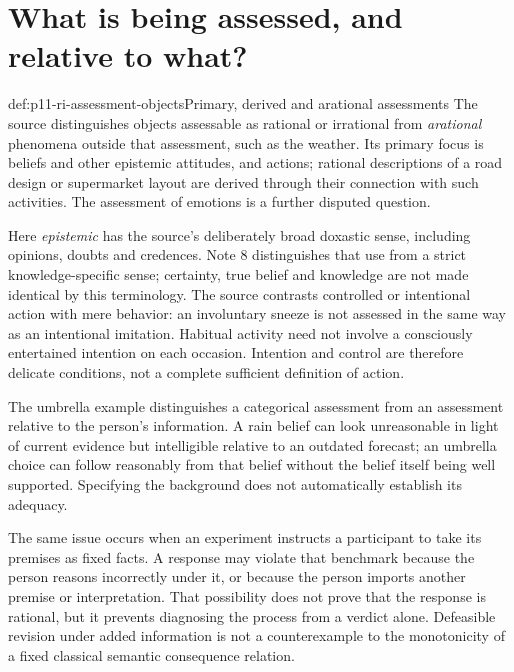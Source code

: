 \section{What is being assessed, and relative to what?}

\begin{hbdefinition}{def:p11-ri-assessment-objects}{Primary, derived and arational assessments}
The source distinguishes objects assessable as rational or irrational
from \emph{arational} phenomena outside that assessment, such as
the weather. Its primary focus is beliefs and other epistemic attitudes,
and actions; rational descriptions of a road design or supermarket
layout are derived through their connection with such activities.
The assessment of emotions is a further disputed question.

Here \emph{epistemic} has the source's deliberately broad doxastic
sense, including opinions, doubts and credences. Note 8 distinguishes
that use from a strict knowledge-specific sense; certainty, true
belief and knowledge are not made identical by this terminology.
The source contrasts controlled or intentional action with mere
behavior: an involuntary sneeze is not assessed in the same way as
an intentional imitation. Habitual activity need not involve a
consciously entertained intention on each occasion. Intention and
control are therefore delicate conditions, not a complete sufficient
definition of action.
\cite[pp.~7--8 and notes~8--9]{KnauffSpohn2021FrameworksIntro}
\end{hbdefinition}

The umbrella example distinguishes a categorical assessment from an
assessment relative to the person's information. A rain belief can
look unreasonable in light of current evidence but intelligible relative
to an outdated forecast; an umbrella choice can follow reasonably from
that belief without the belief itself being well supported. Specifying
the background does not automatically establish its adequacy.

The same issue occurs when an experiment instructs a participant to
take its premises as fixed facts. A response may violate that benchmark
because the person reasons incorrectly under it, or because the person
imports another premise or interpretation. That possibility does not
prove that the response is rational, but it prevents diagnosing the
process from a verdict alone. Defeasible revision under added information
is not a counterexample to the monotonicity of a fixed classical
semantic consequence relation.

